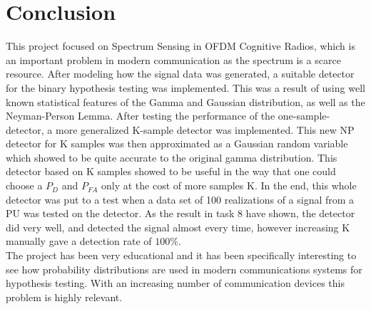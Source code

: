 \section{Conclusion}\label{sec:conclusion}
This project focused on Spectrum Sensing in OFDM Cognitive Radios, which is an important problem in modern communication as the spectrum is a scarce resource. After modeling how the signal data was generated, a suitable detector for the binary hypothesis testing was implemented. This was a result of using well known statistical features of the Gamma and Gaussian distribution, as well as the Neyman-Person Lemma. After testing the performance of the one-sample-detector, a more generalized K-sample detector was implemented. This new NP detector for K samples was then approximated as a Gaussian random variable which showed to be quite accurate to the original gamma distribution. This detector based on K samples showed to be useful in the way that one could choose a $P_{D}$ and $P_{FA}$ only at the cost of more samples K. In the end, this whole detector was put to a test when a data set of 100 realizations of a signal from a PU was tested on the detector. As the result in task 8 have shown, the detector did very well, and detected the signal almost every time, however increasing K manually gave a detection rate of $100\%$.\\
The project has been very educational and it has been specifically interesting to see how probability distributions are used in modern communications systems for hypothesis testing. With an increasing number of communication devices this problem is highly relevant.


